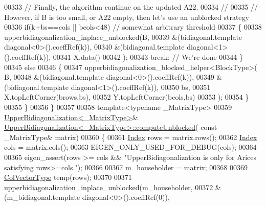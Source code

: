 \begin{DoxyCode}
00333     \textcolor{comment}{// Finally, the algorithm continue on the updated A22.}
00334     \textcolor{comment}{//}
00335     \textcolor{comment}{// However, if B is too small, or A22 empty, then let's use an unblocked strategy}
00336     \textcolor{keywordflow}{if}(k+bs==cols || bcols<48) \textcolor{comment}{// somewhat arbitrary threshold}
00337     \{
00338       upperbidiagonalization\_inplace\_unblocked(B,
00339                                                &(bidiagonal.template diagonal<0>().coeffRef(k)),
00340                                                &(bidiagonal.template diagonal<1>().coeffRef(k)),
00341                                                X.data()
00342                                               );
00343       \textcolor{keywordflow}{break}; \textcolor{comment}{// We're done}
00344     \}
00345     \textcolor{keywordflow}{else}
00346     \{
00347       upperbidiagonalization\_blocked\_helper<BlockType>( B,
00348                                                         &(bidiagonal.template diagonal<0>().coeffRef(k)),
00349                                                         &(bidiagonal.template diagonal<1>().coeffRef(k)),
00350                                                         bs,
00351                                                         X.topLeftCorner(brows,bs),
00352                                                         Y.topLeftCorner(bcols,bs)
00353                                                       );
00354     \}
00355   \}
00356 \}
00357 
00358 \textcolor{keyword}{template}<\textcolor{keyword}{typename} \_MatrixType>
00359 \hyperlink{class_eigen_1_1internal_1_1_upper_bidiagonalization}{UpperBidiagonalization<\_MatrixType>}& 
      \hyperlink{class_eigen_1_1internal_1_1_upper_bidiagonalization}{UpperBidiagonalization<\_MatrixType>::computeUnblocked}(\textcolor{keyword}{
      const} \_MatrixType& matrix)
00360 \{
00361   \hyperlink{class_eigen_1_1internal_1_1_upper_bidiagonalization_adcb14f3919a3dcc9977ba6b8105087fe}{Index} rows = matrix.rows();
00362   \hyperlink{class_eigen_1_1internal_1_1_upper_bidiagonalization_adcb14f3919a3dcc9977ba6b8105087fe}{Index} cols = matrix.cols();
00363   EIGEN\_ONLY\_USED\_FOR\_DEBUG(cols);
00364 
00365   eigen\_assert(rows >= cols && \textcolor{stringliteral}{"UpperBidiagonalization is only for Arices satisfying rows>=cols."});
00366 
00367   m\_householder = matrix;
00368 
00369   \hyperlink{group___core___module_class_eigen_1_1_matrix}{ColVectorType} temp(rows);
00370 
00371   upperbidiagonalization\_inplace\_unblocked(m\_householder,
00372                                            &(m\_bidiagonal.template diagonal<0>().coeffRef(0)),

\end{DoxyCode}
